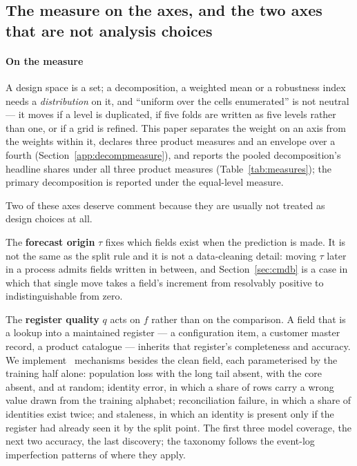 \subsection{The measure on the axes, and the two axes that are not analysis choices}
\label{app:measurechoice}


\paragraph{On the measure}
A design space is a set; a decomposition, a weighted mean or a robustness
index needs a \emph{distribution} on it, and ``uniform over the cells enumerated'' is not neutral --- it moves if a level is duplicated, if five
folds are written as five levels rather than one, or if a grid is refined.
This paper separates the weight on an axis from the weights within it,
declares three product measures and an envelope over a fourth
(Section~\ref{app:decompmeasure}), and reports the pooled decomposition's
headline shares under all three product measures (Table~\ref{tab:measures});
the primary decomposition is reported under the equal-level measure.

Two of these axes deserve comment because they are usually not treated as
design choices at all.

The \textbf{forecast origin} $\tau$ fixes which fields exist when the prediction
is made. It is not the same as the split rule and it is not a data-cleaning
detail: moving $\tau$ later in a process admits fields written in between, and
Section~\ref{sec:cmdb} is a case in which that single move takes a field's
increment from resolvably positive to indistinguishable from zero.

The \textbf{register quality} $q$ acts on $f$ rather than on the comparison. A
field that is a lookup into a maintained register --- a configuration item, a
customer master record, a product catalogue --- inherits that register's
completeness and accuracy. We implement \nQualityKinds\ mechanisms besides the
clean field, each parameterised by the training half alone: population loss
with the long tail absent, with the core absent, and at random; identity
error, in which a share of rows carry a wrong value drawn from the training
alphabet; reconciliation failure, in which a share of identities exist twice;
and staleness, in which an identity is present only if the register had
already seen it by the split point. The first three model coverage, the next
two accuracy, the last discovery; the taxonomy follows the event-log
imperfection patterns of \citet{suriadi2017imperfection} where they apply.

